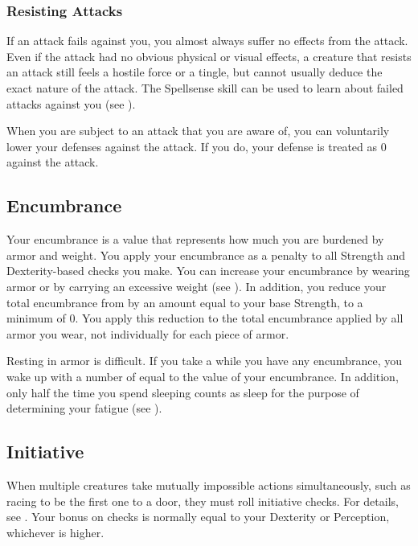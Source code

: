         \subsubsection{Resisting Attacks}
            If an attack fails against you, you almost always suffer no effects from the attack.
            Even if the attack had no obvious physical or visual effects, a creature that resists an attack still feels a hostile force or a tingle, but cannot usually deduce the exact nature of the attack.
            The Spellsense skill can be used to learn about failed  attacks against you (see ).

             When you are subject to an attack that you are aware of, you can voluntarily lower your defenses against the attack.
            If you do, your defense is treated as 0 against the attack.

    \subsection{Encumbrance}\label{Encumbrance}
        Your encumbrance is a value that represents how much you are burdened by armor and weight.
        You apply your encumbrance as a penalty to all Strength and Dexterity-based checks you make.
        You can increase your encumbrance by wearing armor or by carrying an excessive weight (see ).
        In addition, you reduce your total encumbrance from  by an amount equal to your base Strength, to a minimum of 0.
        You apply this reduction to the total encumbrance applied by all armor you wear, not individually for each piece of armor.

        Resting in armor is difficult.
        If you take a  while you have any encumbrance, you wake up with a number of  equal to the value of your encumbrance.
        In addition, only half the time you spend sleeping counts as sleep for the purpose of determining your fatigue (see ).

    \subsection{Initiative}\label{Initiative}
        When multiple creatures take mutually impossible actions simultaneously, such as racing to be the first one to a door, they must roll initiative checks.
        For details, see .
        Your bonus on  checks is normally equal to your Dexterity or Perception, whichever is higher.

